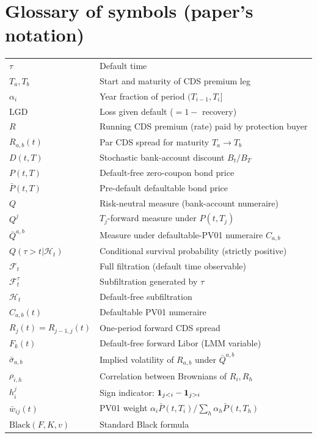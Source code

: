 \documentclass[11pt,a4paper]{article}
\begin{document}
\section{Glossary of symbols (paper's notation)}
\begin{tabular}{@{}p{3cm}p{12cm}@{}}
\toprule
$\tau$                      & Default time \\
$T_a, T_b$                  & Start and maturity of CDS premium leg \\
$\alpha_i$                  & Year fraction of period $(T_{i-1}, T_i]$ \\
$\mathrm{LGD}$              & Loss given default ($= 1 - $ recovery) \\
$R$                         & Running CDS premium (rate) paid by protection buyer \\
$R_{a,b}(t)$                & Par CDS spread for maturity $T_a \to T_b$ \\
$D(t, T)$                   & Stochastic bank-account discount $B_t/B_T$ \\
$P(t, T)$                   & Default-free zero-coupon bond price \\
$\bar P(t, T)$              & Pre-default defaultable bond price \\
$Q$                         & Risk-neutral measure (bank-account numeraire) \\
$Q^j$                       & $T_j$-forward measure under $P(t, T_j)$ \\
$\bar Q^{a,b}$              & Measure under defaultable-PV01 numeraire $C_{a,b}$ \\
$Q(\tau > t | \mathcal{H}_t)$ & Conditional survival probability (strictly positive) \\
$\mathcal{F}_t$             & Full filtration (default time observable) \\
$\mathcal{F}^\tau_t$        & Subfiltration generated by $\tau$ \\
$\mathcal{H}_t$             & Default-free subfiltration \\
$C_{a,b}(t)$                & Defaultable PV01 numeraire \\
$R_j(t) = R_{j-1,j}(t)$     & One-period forward CDS spread \\
$F_k(t)$                    & Default-free forward Libor (LMM variable) \\
$\bar\sigma_{a,b}$          & Implied volatility of $R_{a,b}$ under $\bar Q^{a,b}$ \\
$\rho_{i,h}$                & Correlation between Brownians of $R_i, R_h$ \\
$h^j_i$                     & Sign indicator: $\mathbf{1}_{j<i} - \mathbf{1}_{j>i}$ \\
$\bar w_{ij}(t)$            & PV01 weight $\alpha_i \bar P(t, T_i)/\sum_h \alpha_h \bar P(t, T_h)$ \\
$\text{Black}(F, K, v)$     & Standard Black formula \\
\bottomrule
\end{tabular}
\end{document}
